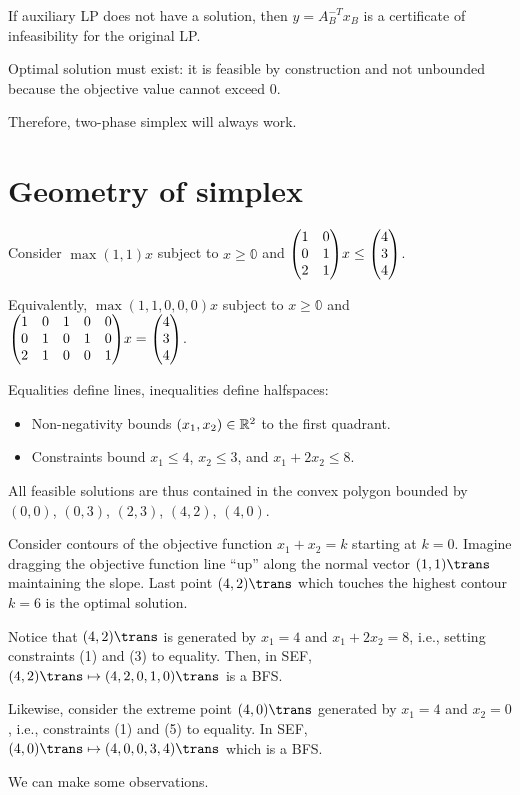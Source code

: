 If auxiliary LP does not have a solution, then $y = A_B^{-T}x_B$ is
a certificate of infeasibility for the original LP.

Optimal solution must exist: it is feasible by construction and not
unbounded because the objective value cannot exceed 0.

Therefore, two-phase simplex will always work.

\section{Geometry of simplex}
Consider $\max{(1,1)x}$ subject to
$x \geq \mathbb0$ and $\mqty(1&0\\0&1\\2&1)x \leq \mqty(4\\3\\4)$.

Equivalently, $\max{(1,1,0,0,0)x}$ subject to $x \geq \mathbb0$ and
$\mqty(\mqty{\imat2\\2&1}&\mqty{\imat3})x = \mqty(4\\3\\4)$.

Equalities define lines, inequalities define halfspaces:
\begin{itemize}[noitemsep]
  \item Non-negativity bounds $(x_1, x_2) \in \mathbb{R}^2$ to the first quadrant.
  \item Constraints bound $x_1 \leq 4$, $x_2 \leq 3$, and $x_1 + 2x_2 \leq 8$.
\end{itemize}
All feasible solutions are thus contained in the convex polygon bounded by
$(0,0)$, $(0,3)$, $(2,3)$, $(4,2)$, $(4,0)$.

Consider contours of the objective function $x_1 + x_2 = k$ starting at $k=0$.
Imagine dragging the objective function line ``up'' along the normal
vector $(1,1)\trans$ maintaining the slope.
Last point $(4,2)\trans$ which touches the highest contour $k=6$ is
the optimal solution.

Notice that $(4,2)\trans$ is generated by $x_1=4$ and $x_1 + 2x_2 = 8$,
i.e., setting constraints (1) and (3) to equality.
Then, in SEF, $(4,2)\trans \mapsto (4,2,0,1,0)\trans$ is a BFS.

Likewise, consider the extreme point $(4,0)\trans$
generated by $x_1 = 4$ and $x_2 = 0$, i.e.,
constraints (1) and (5) to equality.
In SEF, $(4,0)\trans \mapsto (4,0,0,3,4)\trans$ which is a BFS.

We can make some observations.

